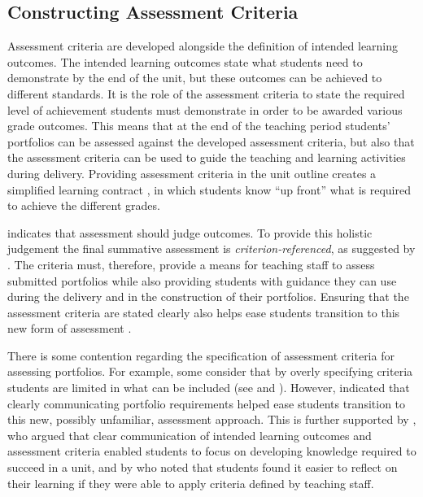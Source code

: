 \subsection{Constructing Assessment Criteria} %
\label{sub:constructing_assessment_criteria}

Assessment criteria are developed alongside the definition of intended learning outcomes. The intended learning outcomes state what students need to demonstrate by the end of the unit, but these outcomes can be achieved to different standards. It is the role of the assessment criteria to state the required level of achievement students must demonstrate in order to be awarded various grade outcomes. This means that at the end of the teaching period students' portfolios can be assessed against the developed assessment criteria, but also that the assessment criteria can be used to guide the teaching and learning activities during delivery. Providing assessment criteria in the unit outline creates a simplified learning contract \cite{Stephenson:1993}, in which students know ``up front'' what is required to achieve the different grades. 

 indicates that assessment should judge outcomes. To provide this holistic judgement the final summative assessment is \emph{criterion-referenced}, as suggested by \citet{Biggs:1997}. The criteria must, therefore, provide a means for teaching staff to assess submitted portfolios while also providing students with guidance they can use during the delivery and in the construction of their portfolios. Ensuring that the assessment criteria are stated clearly also helps ease students transition to this new form of assessment \cite{Smith:2001}.

There is some contention regarding the specification of assessment criteria for assessing portfolios. For example, some consider that by overly specifying criteria students are limited in what can be included (see \citet{Driessen:2005} and \citet{Tigelaar:2007}). However, \citet{Smith:2001} indicated that clearly communicating portfolio requirements helped ease students transition to this new, possibly unfamiliar, assessment approach. This is further supported by \citet{Allan:1996}, who argued that clear communication of intended learning outcomes and assessment criteria enabled students to focus on developing knowledge required to succeed in a unit, and by \citet{Thorpe:2000} who noted that students found it easier to reflect on their learning if they were able to apply criteria defined by teaching staff.

